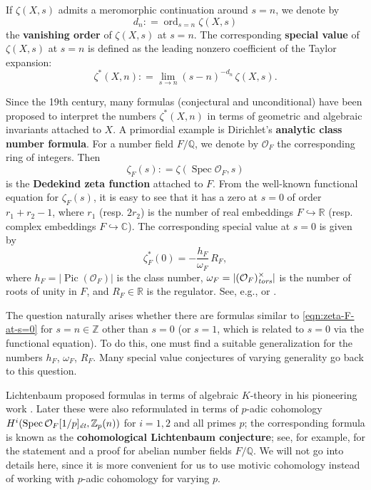 \documentclass[draft]{article}
\DeclareMathOperator{\ord}{ord}
\DeclareMathOperator{\Pic}{Pic}
\DeclareMathOperator{\Spec}{Spec}
\newcommand{\CC}{\mathbb{C}}
\newcommand{\QQ}{\mathbb{Q}}
\newcommand{\RR}{\mathbb{R}}
\newcommand{\ZZ}{\mathbb{Z}}
\newcommand{\et}{\text{\it \'{e}t}}
\newcommand{\tors}{\text{\it tors}}
\newcommand{\dfn}{\mathrel{\mathop:}=}
\theoremstyle{myplain}
\theoremstyle{mydefinition}
\begin{document}
If $\zeta (X,s)$ admits a meromorphic continuation around $s = n$, we denote by
\begin{equation}
  \label{eqn:vanishing-order}
  d_n \dfn \ord_{s=n} \zeta (X,s)
\end{equation}
the \textbf{vanishing order} of $\zeta (X,s)$ at $s = n$. The corresponding
\textbf{special value} of $\zeta (X,s)$ at $s = n$ is defined as the leading
nonzero coefficient of the Taylor expansion:
$$\zeta^* (X,n) \dfn \lim_{s \to n} (s - n)^{-d_n}\,\zeta (X,s).$$

Since the 19th century, many formulas (conjectural and unconditional) have been
proposed to interpret the numbers $\zeta^* (X,n)$ in terms of geometric and
algebraic invariants attached to $X$. A primordial example is Dirichlet's
\textbf{analytic class number formula}. For a number field $F/\QQ$, we denote by
$\mathcal{O}_F$ the corresponding ring of integers. Then
$$\zeta_F (s) \dfn \zeta (\Spec \mathcal{O}_F, s)$$
is the \textbf{Dedekind zeta function} attached to $F$. From the well-known
functional equation for $\zeta_F (s)$, it is easy to see that it has a zero at
$s = 0$ of order $r_1 + r_2 - 1$, where $r_1$ (resp.  $2 r_2$) is the number of
real embeddings $F \hookrightarrow \RR$ (resp. complex embeddings
$F \hookrightarrow \CC$). The corresponding special value at $s = 0$ is given by
\begin{equation}
  \label{eqn:zeta-F-at-s=0}
  \zeta^*_F (0) = -\frac{h_F}{\omega_F}\,R_F,
\end{equation}
where $h_F = |\Pic (\mathcal{O}_F)|$ is the class number,
$\omega_F = |(\mathcal{O}_F)^\times_\tors|$ is the number of roots of unity in
$F$, and $R_F \in \RR$ is the regulator. See, e.g.,
\cite[Chapter~5, \S 1]{Borevich-Shafarevich} or \cite[\S VII.5]{Neukirch-1999}.

The question naturally arises whether there are formulas similar to
\eqref{eqn:zeta-F-at-s=0} for $s = n \in \ZZ$ other than $s = 0$ (or $s = 1$,
which is related to $s = 0$ via the functional equation). To do this, one must
find a suitable generalization for the numbers $h_F$, $\omega_F$, $R_F$.  Many
special value conjectures of varying generality go back to this question.

Lichtenbaum proposed formulas in terms of algebraic $K$-theory in his pioneering
work \cite{Lichtenbaum-1973}. Later these were also reformulated in terms of
$p$-adic cohomology $H^i (\Spec \mathcal{O}_F [1/p]_\et, \ZZ_p (n))$ for
$i = 1,2$ and all primes $p$; the corresponding formula is known as the
\textbf{cohomological Lichtenbaum conjecture}; see, for example,
\cite[\S 1.7]{Huber-Kings-2003} for the statement and a proof for abelian number
fields $F/\QQ$. We will not go into details here, since it is more convenient
for us to use motivic cohomology instead of working with $p$-adic cohomology for
varying $p$.
\end{document}
